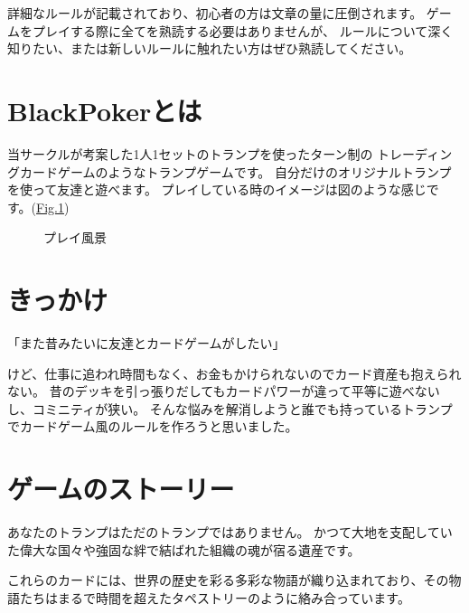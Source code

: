 \documentclass[letterpaper,10pt,dvipdfmx]{sphinxmanual}
\begin{document}
\sphinxAtStartPar
詳細なルールが記載されており、初心者の方は文章の量に圧倒されます。
ゲームをプレイする際に全てを熟読する必要はありませんが、
ルールについて深く知りたい、または新しいルールに触れたい方はぜひ熟読してください。


\section{BlackPokerとは}
\label{\detokenize{init/init:blackpoker}}
\sphinxAtStartPar
当サークルが考案した1人1セットのトランプを使ったターン制の
トレーディングカードゲームのようなトランプゲームです。
自分だけのオリジナルトランプを使って友達と遊べます。
プレイしている時のイメージは図のような感じです。(\hyperref[\detokenize{init/init:play-image}]{Fig.\@ \ref{\detokenize{init/init:play-image}}})

\begin{figure}[htbp]
\centering
\capstart

\noindent{}
\caption{プレイ風景}\label{\detokenize{init/init:id7}}\label{\detokenize{init/init:play-image}}\end{figure}


\section{きっかけ}
\label{\detokenize{init/init:id2}}
\begin{sphinxVerbatim}[commandchars=\\\{\}]
「また昔みたいに友達とカードゲームがしたい」
\end{sphinxVerbatim}

\sphinxAtStartPar
けど、仕事に追われ時間もなく、お金もかけられないのでカード資産も抱えられない。
昔のデッキを引っ張りだしてもカードパワーが違って平等に遊べないし、コミニティが狭い。
そんな悩みを解消しようと誰でも持っているトランプでカードゲーム風のルールを作ろうと思いました。


\section{ゲームのストーリー}
\label{\detokenize{init/init:id3}}
\sphinxAtStartPar
あなたのトランプはただのトランプではありません。
かつて大地を支配していた偉大な国々や強固な絆で結ばれた組織の魂が宿る遺産です。

\sphinxAtStartPar
これらのカードには、世界の歴史を彩る多彩な物語が織り込まれており、その物語たちはまるで時間を超えたタペストリーのように絡み合っています。
\end{document}
